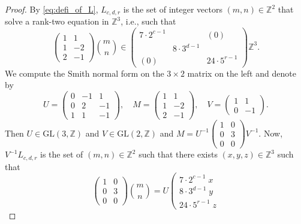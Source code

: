 \documentclass[11pt,letterpaper]{amsart}
\theoremstyle{definition}
\theoremstyle{remark}
\renewcommand{\rm}[1]{\mathrm{#1}}
\newcommand{\bb}[1]{\mathbb{#1}}
\newcommand{\Z}{\bb Z}
\newcommand{\GL}{\rm{GL}}
\begin{document}
	\begin{proof}
		By \cref{eq:defi_of_L}, $L_{c,d,r}$ is the set of integer vectors $(m,n) \in \Z^2$ that solve a rank-two equation in $\Z^3$, i.e., such that 
		$$ 
		\left(\begin{array}{rr}
			1 & 1 \\
			1 & -2 \\
			2 & -1
		\end{array}\right)
		\binom{m}{n} \in 
		\left(\begin{array}{ccc}
			7 \cdot 2^{c-1} & & (0) \\
			& 8 \cdot 3^{d-1} & \\
			(0) & & 24 \cdot 5^{r-1}
		\end{array}\right) \Z^3 .$$
		We compute the Smith normal form on the $3 \times 2$ matrix on the left and denote by 
		$$ 
		U = \left( 
		\begin{array}{rrr}
			0 &  -1 & 1\\
			0 & 2 &  -1\\
			1 & 1 &  -1
		\end{array}\right) , \quad
		M = 
		\left(
		\begin{array}{rr}
			1 & 1 \\
			1 & -2 \\
			2 & -1 
		\end{array}\right), \quad
		V = \left( 
		\begin{array}{rr}
			1 & 1\\
			0 & -1  
		\end{array}\right).
		$$ 
		Then $U \in \GL(3,\Z)$ and $V \in \GL(2,\Z)$ and
		$     M = U^{-1} \left(
		\begin{array}{rr}
			1 & 0 \\
			0 & 3 \\
			0 & 0
		\end{array} \right) V^{-1}.
		$
		Now, $V^{-1} L_{c,d,r}$ is the set of $(m,n)\in \Z^2$ such that there exists $(x,y,z) \in \Z^3$ such that
		\begin{equation}\label{eq:nicer-Lcde}
			\left(
			\begin{array}{rr}
				1 & 0 \\
				0 & 3 \\
				0 & 0
			\end{array} \right) 
			\binom{m}{n} =
			U  \left(\begin{array}{r}
				7 \cdot 2^{c-1} \; x  \\
				8 \cdot 3^{d-1} \; y \\
				24 \cdot 5^{r-1}\; z

\end{array}
\end{equation}
\end{proof}
\end{document}
